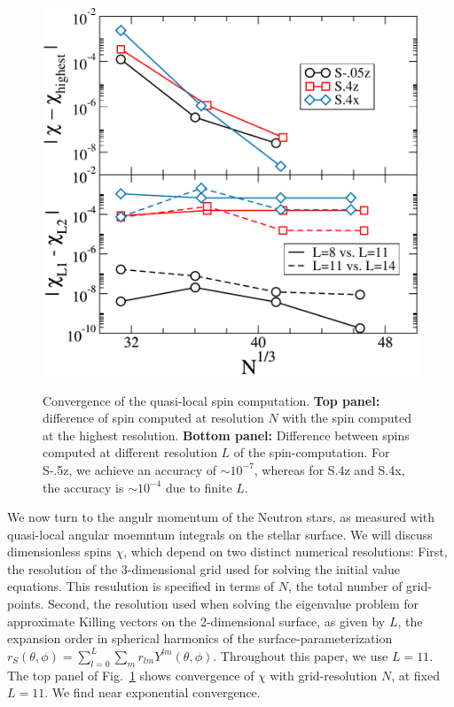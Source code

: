 \documentclass[aps,prd,amsmath,floatfix
,twocolumn
,superscriptaddress,nofootinbib,showpacs]{revtex4-1}
\theoremstyle{plain} \newtheorem{thm}{Theorem} \newtheorem{lem}{Lemma}
\newcommand{\harald}[1]{{\textcolor{OliveGreen}{#1}}} %
\newcommand{\roland}[1]{\textcolor{Magenta}{\textit{ROLAND: #1}}}
\begin{document}
\begin{figure}
\includegraphics[width=0.95\columnwidth]{SpinConvergence}\\

\caption{\label{fig:SpinConvergence} Convergence of the quasi-local
  spin computation.  {\bf Top panel:} difference of spin computed at
  resolution $N$ with the spin computed at the highest resolution.
  {\bf Bottom panel:} Difference between spins computed at different
  resolution $L$ of the spin-computation.  For S-.5z, we achieve an
  accuracy of $\sim 10^{-7}$, whereas for S.4z and S.4x, the
  accuracy is $\sim 10^{-4}$ due to finite $L$.}
\end{figure}

We now turn to the angulr momentum of the Neutron stars, as measured
with quasi-local angular moemntum integrals on the stellar surface.
We will discuss dimensionless spins $\chi$, which depend on two
distinct numerical resolutions: First, the resolution of the
3-dimensional grid used for solving the initial value equations.  This
resulution is specified in terms of $N$, the total number of
grid-points.  Second, the resolution used when solving the eigenvalue
problem for approximate Killing vectors on the 2-dimensional surface,
as given by $L$, the \harald{expansion order in spherical harmonics of the surface-parameterization $r_S(\theta,\phi)=\sum_{l=0}^L\sum_m r_{lm}Y^{lm}(\theta,\phi)$.}
Throughout this paper, we use $L=11$.  The top panel of
Fig.~\ref{fig:SpinConvergence} shows convergence of $\chi$ with
grid-resolution $N$, at fixed $L=11$.  We find near exponential
convergence.
\end{document}
